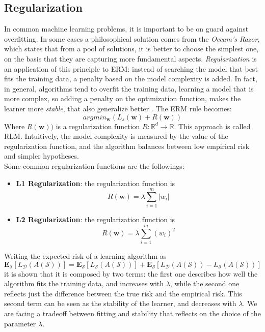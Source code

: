 \subsection{Regularization}
In common machine learning problems, it is important to be on guard against overfitting. In some cases a philosophical solution comes from the \textit{Occam's Razor}, which states that from a pool of solutions, it is better to choose the simplest one, on the basis that they are capturing more fundamental aspects. \textit{Regularization} is an application of this principle to \ac{ERM}: instead of searching the model that best fits the training data, a penalty based on the model complexity is added. In fact, in general, algorithms tend to overfit the training data, learning a model that is more complex, so adding a penalty on the optimization function, makes the learner more \textit{stable}, that also generalize better \cite{stability_generalization}.
The \ac{ERM} rule becomes:
\[argmin_\mathbf{w} (L_s(\mathbf{w}) + R(\mathbf{w}))\]
Where $R(\mathbf{w}))$ is a regularization function $R: \mathbb{R}^d \rightarrow \mathbb{R} $. This approach is called \ac{RLM}. Intuitively, the model complexity is measured by the value of the regularization function, and the algorithm balances between low empirical risk and simpler hypotheses.\\
Some common regularization functions are the followings:
\begin{itemize}
	\item \textbf{L1 Regularization}: the regularization function is
	\[ R(\textbf{w}) = \lambda \sum_{i=1}^{m} |w_i| \]
	\item \textbf{L2 Regularization}: the regularization function is
	\[ R(\textbf{w}) = \lambda \sum_{i=1}^{m} (w_i)^2 \]
\end{itemize}

Writing the expected risk of a learning algorithm as
\[ \mathbf{E}_\mathcal{S}[L_\mathcal{D}(A(\mathcal{S}))] = \mathbf{E}_\mathcal{S}[L_\mathcal{S}(A(\mathcal{S}))] + \mathbf{E}_\mathcal{S}[L_\mathcal{D}(A(\mathcal{S})) - L_\mathcal{S}(A(\mathcal{S}))] \]
it is shown that it is composed by two terms: the first one describes how well the algorithm fits the training data, and increases with $\lambda$, while the second one reflects just the difference between the true risk and the empirical risk. This second term can be seen as the stability of the learner, and decreases with $\lambda$. We are facing a tradeoff between fitting and stability that reflects on the choice of the parameter $\lambda$. 



